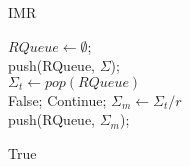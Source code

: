 \IncMargin{1em}
\begin{algorithm}\label{alg_prqa}
	{\small
		\caption{IMR}
		$RQueue \leftarrow \emptyset$;\\
		push(RQueue, $\Sigma$);\\
		{
			$\Sigma_t \leftarrow pop(RQueue)$\\
			{
				{
					\Return False;
				}
				Continue;
			}
			{
				$\Sigma_m \leftarrow \Sigma_t / r$\\
				push(RQueue, $\Sigma_m$);\\
			}  
		}
		
		\Return True
	}
	\vspace*{-1mm}
\end{algorithm}
\DecMargin{1em}
